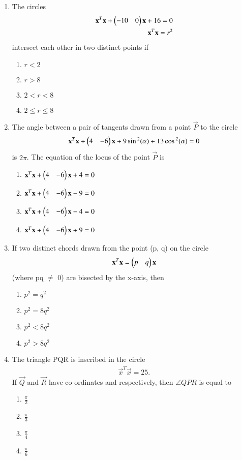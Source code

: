 \begin{enumerate}[label=\arabic*.,ref=\thesubsection.\theenumi]
\item The circles 
\begin{align}
\mathbf{x}^T\mathbf{x} + \begin{pmatrix}-10 & 0\end{pmatrix}\mathbf{x} + 16 = 0 \\
\mathbf{x}^T\mathbf{x} = r^{2}
\end{align}
intersect each other in two distinct points if
\begin{enumerate}
\item $r < 2$
\item $r > 8$
\item $2 < r < 8$
\item $2 \leq r \leq  8$
\end{enumerate}
 
\item The angle between a pair of tangents drawn  from a point $\vec{P}$  to the circle 
\begin{align}
\mathbf{x}^T\mathbf{x} + \begin{pmatrix}4 & -6\end{pmatrix}\mathbf{x} + 9\sin{^{2}(\alpha)} + 13\cos{^2(\alpha)} = 0
\end{align} 
is $2\pi$. The equation of the locus of the point $\vec{P}$ is 
\begin{enumerate}
\item $\mathbf{x}^T\mathbf{x} + \begin{pmatrix}4 & -6\end{pmatrix}\mathbf{x} + 4 = 0$
\item $\mathbf{x}^T\mathbf{x} + \begin{pmatrix}4 & -6\end{pmatrix}\mathbf{x} - 9 = 0$
\item $\mathbf{x}^T\mathbf{x} + \begin{pmatrix}4 & -6\end{pmatrix}\mathbf{x} - 4 = 0$
\item $\mathbf{x}^T\mathbf{x} + \begin{pmatrix}4 & -6\end{pmatrix}\mathbf{x} + 9 = 0$  
\end{enumerate}
    
\item If two distinct chords drawn from the point (p, q) on the circle 
\begin{align}
\mathbf{x}^T\mathbf{x} = \begin{pmatrix}p & q\end{pmatrix}\mathbf{x}
\end{align}
(where pq $\neq$ 0) are bisected by the x-axis, then 
\begin{enumerate}
\item $p^2 = q^2$
\item $p^2 = 8q^2$
\item $p^2 < 8q^2$
\item $p^2 > 8q^2$   
\end{enumerate}
    
\item The triangle PQR is inscribed in the circle 
\begin{align}
\vec{x}^T\vec{x} = 25.
\end{align} 
If $\vec{Q}$ and $\vec{R}$ have co-ordinates  and  respectively, then 
$\angle QPR$ is equal to
\begin{enumerate}
\item $\frac{\pi}{2}$
\item $\frac{\pi}{3}$
\item $\frac{\pi}{4}$
\item $\frac{\pi}{6}$
\end{enumerate}
    

\end{enumerate}
